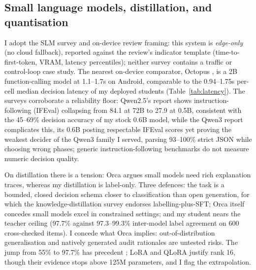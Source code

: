 \subsection{Small language models, distillation, and quantisation}\label{sec:bg-slm}

I adopt the SLM survey \cite{slmsurvey2024} and on-device review \cite{ondevice2024} framing: this system is \emph{edge-only} (no cloud fallback), reported against the review's indicator template (time-to-first-token, VRAM, latency percentiles); neither survey contains a traffic or control-loop case study. The nearest on-device comparator, Octopus \cite{octopus2024}, is a 2B function-calling model at 1.1--1.7s on Android, comparable to the 0.94--1.75s per-cell median decision latency of my deployed students (Table~\ref{tab:latency}). The surveys corroborate a reliability floor: Qwen2.5's report \cite{qwen25report} shows instruction-following (IFEval) collapsing from 84.1 at 72B to 27.9 at 0.5B, consistent with the 45--69\% decision accuracy of my stock 0.6B model, while the Qwen3 report \cite{qwen3report} complicates this, its 0.6B posting respectable IFEval scores yet proving the weakest decider of the Qwen3 family I served, parsing 93--100\% strict JSON while choosing wrong phases; generic instruction-following benchmarks do not measure numeric decision quality.

On distillation there is a tension: Orca \cite{mukherjee2023orca} argues small models need rich explanation traces, whereas my distillation is label-only. Three defences: the task is a bounded, closed decision schema closer to classification than open generation, for which the knowledge-distillation survey \cite{xu2024kdsurvey} endorses labelling-plus-SFT; Orca itself concedes small models excel in constrained settings; and my student nears the teacher ceiling (97.7\% against 97.3--99.3\% inter-model label agreement on 600 cross-checked items). I concede what Orca implies: out-of-distribution generalisation and natively generated audit rationales are untested risks. The jump from 55\% to 97.7\% has precedent \cite{hsieh2023distilling,babyllama2023}; LoRA \cite{hu2021lora} and QLoRA \cite{dettmers2023qlora} justify rank 16, though their evidence stops above 125M parameters, and I flag the extrapolation.

